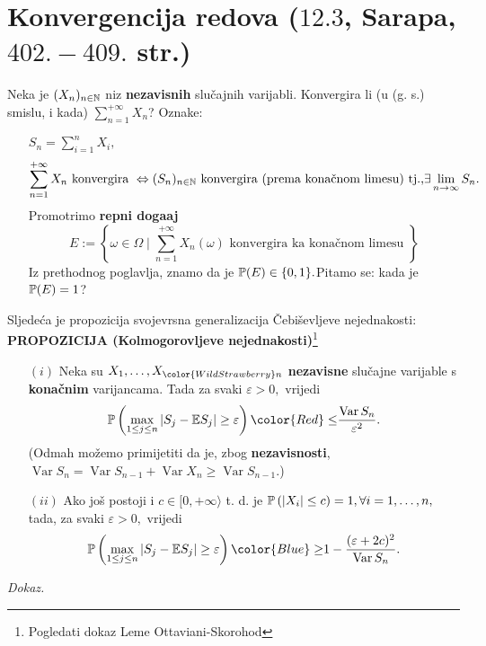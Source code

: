 \documentclass{article}
\newcommand{\Var}{\operatorname{Var}}
\begin{document}
\section{Konvergencija redova (\textsection \(12.3\), Sarapa, \(402.-409.\) str.)}
Neka je \((X_n)_{n\in\Bbb N}\) niz \textbf{nezavisnih} slučajnih varijabli. Konvergira li (u (g. s.) smislu, i kada) \(\displaystyle\sum_{n=1}^{+\infty}X_n\)?\newline 
Oznake:
\begin{itemize}
    \item[\ding{228}] \(S_n=\displaystyle\sum_{i=1}^nX_i,\) \[\sum_{n=1}^{+\infty}X_n\text{ konvergira }\Leftrightarrow (S_n)_{n\in\Bbb N}\text{ konvergira (prema konačnom limesu) tj.,}\exists\lim_{n\to\infty}S_n.\] Promotrimo \textbf{repni doga\dj{}aj} \[E:=\left\{\omega\in\Omega\mid\sum_{n=1}^{+\infty}X_n(\omega)\text{ konvergira ka konačnom limesu }\right\}\] Iz prethodnog poglavlja, znamo da je \(\Bbb P(E)\in\{0,1\}.\)\newline Pitamo se: kada je \(\Bbb P(E)=1\)?
\end{itemize}
Sljedeća je propozicija svojevrsna generalizacija Čebiševljeve nejednakosti:\newline\newline
\textbf{PROPOZICIJA (Kolmogorovljeve nejednakosti)}\footnote[15]{Pogledati dokaz Leme Ottaviani-Skorohod}
\begin{enumerate}
    \item[\((i)\)] Neka su \(X_1,\ldots,X_{\color{WildStrawberry}n}\) \textbf{nezavisne} slučajne varijable s \textbf{konačnim} varijancama. Tada za svaki \(\varepsilon>0,\) vrijedi \[\Bbb P\left(\max_{1\le j\le n}|S_j-\Bbb ES_j|\ge\varepsilon\right){\color{Red}\le}\frac{\Var S_n}{\varepsilon^2}.\] (Odmah možemo primijetiti da je, zbog \textbf{nezavisnosti}, \(\Var S_n=\Var S_{n-1}+\Var X_n\ge\Var S_{n-1}.\))
    \item[\((ii)\)] Ako još postoji i \(c\in [0,+\infty\rangle\) t. d. je \(\Bbb P\left(|X_i|\le c\right)=1,\forall i=1,\ldots,n,\) tada, za svaki \(\varepsilon>0,\) vrijedi \[\Bbb P\left(\max_{1\le j\le n}|S_j-\Bbb ES_j|\ge\varepsilon\right){\color{Blue}\ge} 1-\frac{(\varepsilon+2c)^2}{\Var S_n}.\] 
\end{enumerate}
\textit{Dokaz.}\newline
\end{document}
